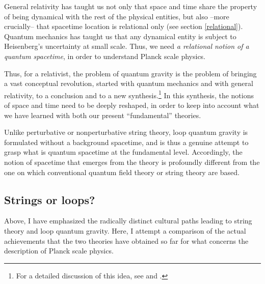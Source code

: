\documentclass[12pt]{article}
\begin{document}
General relativity has taught us not only that space and time share 
the property of being dynamical with the rest of the physical 
entities, but also --more crucially-- that spacetime location is 
relational only (see section \ref{relational}).  Quantum mechanics has 
taught us that any dynamical entity is subject to Heisenberg's 
uncertainty at small scale.  Thus, we need {\em a relational notion of 
a quantum spacetime\/}, in order to understand Planck scale physics.

Thus, for a relativist, the problem of quantum gravity is the 
problem of bringing a vast conceptual revolution, started with 
quantum mechanics and with general relativity, to a conclusion 
and to a new synthesis.\footnote{For a detailed discussion of 
this idea, see \cite{RovelliHalf} and \cite{SmolinBook}.} In this 
synthesis, the notions of space and time need to be deeply 
reshaped, in order to keep into account what we have learned with 
both our present ``fundamental'' theories.

Unlike perturbative or nonperturbative string theory, loop 
quantum gravity is formulated without a background spacetime, and 
is thus a genuine attempt to grasp what is quantum spacetime at 
the fundamental level.  Accordingly, the notion of spacetime that 
emerges from the theory is profoundly different from the one on 
which conventional quantum field theory or string theory are 
based.

\subsection{Strings or loops?} \label{strings}

Above, I have emphasized the radically distinct cultural paths leading 
to string theory and loop quantum gravity.  Here, I attempt a 
comparison of the actual achievements that the two theories have 
obtained so far for what concerns the description of Planck scale 
physics.
\end{document}
